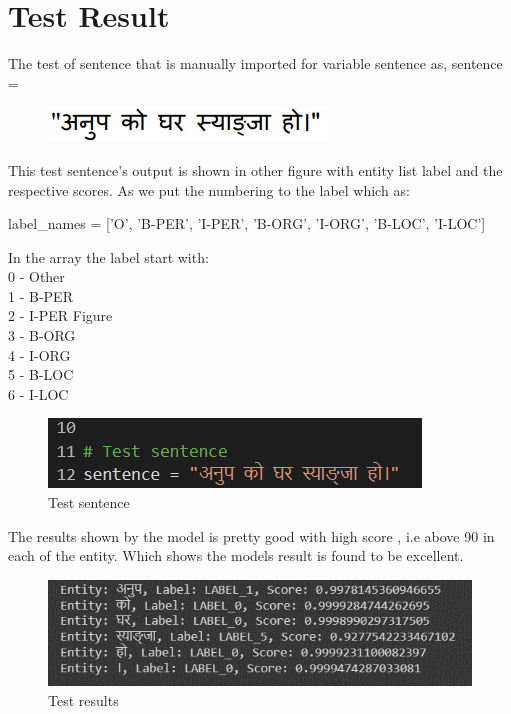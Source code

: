 



\section{Test Result}
\vspace{10pt}

The test of sentence that is manually imported for variable sentence as,
sentence = 
\begin{figure}[H]
\centering
\includegraphics [scale=1.5]{img/result & analysis/anupKOghar.png}

\end{figure}

 
This test sentence’s output is shown in other figure with entity list label and the respective scores. As we put the numbering to the label which as:

label\_names = ['O', 'B-PER', 'I-PER', 'B-ORG', 'I-ORG', 'B-LOC', 'I-LOC']

In the array the label start with:\\
0 -\> Other\\
1 -\> B-PER\\
2 -\> I-PER Figure\\
3 -\> B-ORG\\
4 -\> I-ORG\\
5 -\> B-LOC\\
6 -\> I-LOC\\

\begin{figure}[H]
\centering
\includegraphics [scale=1.5]{img/result & analysis/Test sentence.png}
 \caption[Test sentence]{Test sentence}

\end{figure}

 
The results shown by the model is pretty good with high score , i.e above 90 in each of the entity. Which shows the models result is found to be excellent.

\begin{figure}[H]
\centering
\includegraphics [scale=0.95]{img/result & analysis/Test results.png}
 \caption[Test results]{Test results}

\end{figure}

